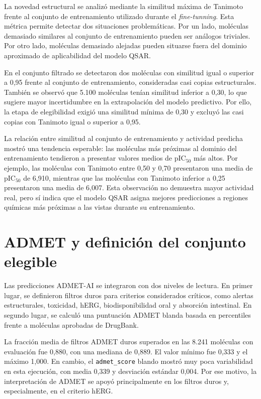 \documentclass[IB]{TFUOC}%
\begin{document}
La novedad estructural se analizó mediante la similitud máxima de Tanimoto frente al conjunto de entrenamiento utilizado durante el \textit{fine-tunning}. Esta métrica permite detectar dos situaciones problemáticas. Por un lado, moléculas demasiado similares al conjunto de entrenamiento pueden ser análogos triviales. Por otro lado, moléculas demasiado alejadas pueden situarse fuera del dominio aproximado de aplicabilidad del modelo QSAR.

En el conjunto filtrado se detectaron dos moléculas con similitud igual o superior a 0,95 frente al conjunto de entrenamiento, consideradas casi copias estructurales. También se observó que 5.100 moléculas tenían similitud inferior a 0,30, lo que sugiere mayor incertidumbre en la extrapolación del modelo predictivo. Por ello, la etapa de elegibilidad exigió una similitud mínima de 0,30 y excluyó las casi copias con Tanimoto igual o superior a 0,95.

La relación entre similitud al conjunto de entrenamiento y actividad predicha mostró una tendencia esperable: las moléculas más próximas al dominio del entrenamiento tendieron a presentar valores medios de pIC$_{50}$ más altos. Por ejemplo, las moléculas con Tanimoto entre 0,50 y 0,70 presentaron una media de pIC$_{50}$ de 6,910, mientras que las moléculas con Tanimoto inferior a 0,25 presentaron una media de 6,007. Esta observación no demuestra mayor actividad real, pero sí indica que el modelo QSAR asigna mejores predicciones a regiones químicas más próximas a las vistas durante su entrenamiento.

\section{ADMET y definición del conjunto elegible}

Las predicciones ADMET-AI se integraron con dos niveles de lectura. En primer lugar, se definieron filtros duros para criterios considerados críticos, como alertas estructurales, toxicidad, hERG, biodisponibilidad oral y absorción intestinal. En segundo lugar, se calculó una puntuación ADMET blanda basada en percentiles frente a moléculas aprobadas de DrugBank.

La fracción media de filtros ADMET duros superados en las 8.241 moléculas con evaluación fue 0,880, con una mediana de 0,889. El valor mínimo fue 0,333 y el máximo 1,000. En cambio, el \texttt{admet\_score} blando mostró muy poca variabilidad en esta ejecución, con media 0,339 y desviación estándar 0,004. Por ese motivo, la interpretación de ADMET se apoyó principalmente en los filtros duros y, especialmente, en el criterio hERG.
\end{document}

